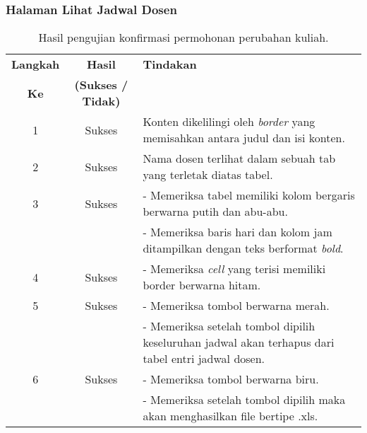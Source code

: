 \subsubsection{Halaman Lihat Jadwal Dosen}
\begin{table}[H]
	\centering 
	\caption{Hasil pengujian konfirmasi permohonan perubahan kuliah.}
	\label{hasil:LihatJadwal}
	\begin{tabular}{|c| c| p{}|}
		\toprule
		\textbf{Langkah} & \textbf{Hasil} & \textbf{Tindakan}\\
		\textbf{Ke} & \textbf{(Sukses / Tidak)} &\\
		\midrule
		1&Sukses&Konten dikelilingi oleh \textit{border} yang memisahkan antara judul dan isi konten.\\
		\hline
		2&Sukses& Nama dosen terlihat dalam sebuah tab yang terletak diatas tabel.\\
		\hline
		3&Sukses&- Memeriksa tabel memiliki kolom bergaris berwarna putih dan abu-abu.\\
		&& - Memeriksa baris hari dan kolom jam ditampilkan dengan teks berformat \textit{bold}.	\\	
		\hline
		4&Sukses&- Memeriksa \textit{cell} yang terisi memiliki border berwarna hitam.\\		
		\hline
		5&Sukses&- Memeriksa tombol berwarna merah.\\
		&& - Memeriksa setelah tombol dipilih keseluruhan jadwal akan terhapus dari tabel entri jadwal dosen.\\
		6& Sukses & - Memeriksa tombol berwarna biru.\\
		&& - Memeriksa setelah tombol dipilih maka akan menghasilkan file bertipe .xls. \\
		\bottomrule		
	\end{tabular} 
\end{table}